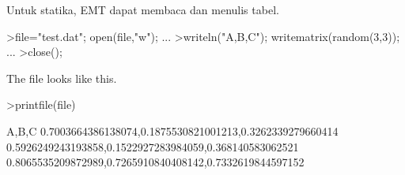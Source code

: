 \documentclass[a4paper,10pt]{article}
\begin{document}
\begin{eulernotebook}
\begin{eulercomment}
\begin{eulercomment}
\begin{eulercomment}
\begin{eulercomment}
\begin{eulercomment}
\begin{eulercomment}
\begin{eulercomment}
\begin{eulercomment}
\begin{eulercomment}
\begin{eulercomment}
\begin{eulercomment}
\begin{eulercomment}
\begin{eulercomment}
\begin{eulercomment}
\begin{eulercomment}
\begin{eulercomment}
\begin{eulercomment}
\begin{eulercomment}
\begin{euleroutput}
\end{euleroutput}
\begin{eulercomment}
Untuk statika, EMT dapat membaca dan menulis tabel.
\end{eulercomment}
\begin{eulerprompt}
>file="test.dat"; open(file,"w"); ...
>writeln("A,B,C"); writematrix(random(3,3)); ...
>close();
\end{eulerprompt}
\begin{eulercomment}
The file looks like this.
\end{eulercomment}
\begin{eulerprompt}
>printfile(file)
\end{eulerprompt}
\begin{euleroutput}
  A,B,C
  0.7003664386138074,0.1875530821001213,0.3262339279660414
  0.5926249243193858,0.1522927283984059,0.368140583062521
  0.8065535209872989,0.7265910840408142,0.7332619844597152
  

\end{euleroutput}
\end{eulercomment}
\end{eulercomment}
\end{eulercomment}
\end{eulercomment}
\end{eulercomment}
\end{eulercomment}
\end{eulercomment}
\end{eulercomment}
\end{eulercomment}
\end{eulercomment}
\end{eulercomment}
\end{eulercomment}
\end{eulercomment}
\end{eulercomment}
\end{eulercomment}
\end{eulercomment}
\end{eulercomment}
\end{eulercomment}
\end{eulernotebook}
\end{document}
